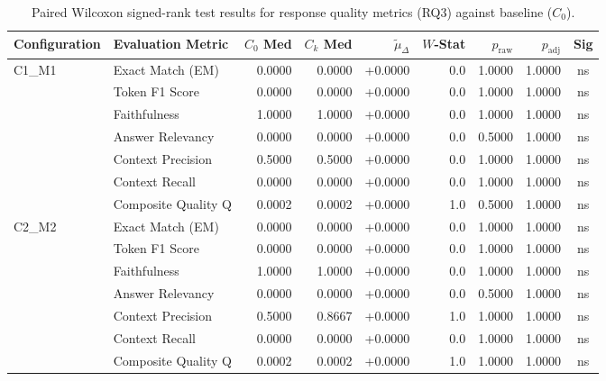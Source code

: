 \begin{table}[p]
\centering
\scriptsize
\setlength{\tabcolsep}{2.4pt}
\renewcommand{\arraystretch}{0.92}
\caption{Paired Wilcoxon signed-rank test results for response quality metrics (RQ3) against baseline ($C_0$).}
\label{tab:wilcoxon_rq3}
\begin{tabular*}{\textwidth}{@{\extracolsep{\fill}} l l r r r r r r c @{}}
\toprule
\textbf{Configuration} & \textbf{Evaluation Metric} & \textbf{$C_0$ Med} & \textbf{$C_k$ Med} & \textbf{$\tilde{\mu}_\Delta$} & \textbf{$W$-Stat} & \textbf{$p_{\text{raw}}$} & \textbf{$p_{\text{adj}}$} & \textbf{Sig} \\
\midrule
C1\_M1          & Exact Match (EM)     & 0.0000 & 0.0000 & +0.0000 & 0.0 & 1.0000 & 1.0000 & ns \\
                & Token F1 Score       & 0.0000 & 0.0000 & +0.0000 & 0.0 & 1.0000 & 1.0000 & ns \\
                & Faithfulness         & 1.0000 & 1.0000 & +0.0000 & 0.0 & 1.0000 & 1.0000 & ns \\
                & Answer Relevancy     & 0.0000 & 0.0000 & +0.0000 & 0.0 & 0.5000 & 1.0000 & ns \\
                & Context Precision    & 0.5000 & 0.5000 & +0.0000 & 0.0 & 1.0000 & 1.0000 & ns \\
                & Context Recall       & 0.0000 & 0.0000 & +0.0000 & 0.0 & 1.0000 & 1.0000 & ns \\
                & Composite Quality Q  & 0.0002 & 0.0002 & +0.0000 & 1.0 & 0.5000 & 1.0000 & ns \\
\addlinespace
C2\_M2          & Exact Match (EM)     & 0.0000 & 0.0000 & +0.0000 & 0.0 & 1.0000 & 1.0000 & ns \\
                & Token F1 Score       & 0.0000 & 0.0000 & +0.0000 & 0.0 & 1.0000 & 1.0000 & ns \\
                & Faithfulness         & 1.0000 & 1.0000 & +0.0000 & 0.0 & 1.0000 & 1.0000 & ns \\
                & Answer Relevancy     & 0.0000 & 0.0000 & +0.0000 & 0.0 & 0.5000 & 1.0000 & ns \\
                & Context Precision    & 0.5000 & 0.8667 & +0.0000 & 1.0 & 1.0000 & 1.0000 & ns \\
                & Context Recall       & 0.0000 & 0.0000 & +0.0000 & 0.0 & 1.0000 & 1.0000 & ns \\
                & Composite Quality Q  & 0.0002 & 0.0002 & +0.0000 & 1.0 & 1.0000 & 1.0000 & ns \\

\end{tabular*}
\end{table}
